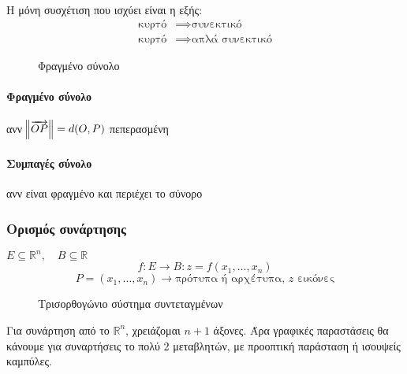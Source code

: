 \documentclass[11pt,a4paper,titlepage]{article}
\begin{document}
\paragraph{}
Η μόνη συσχέτιση που ισχύει είναι η εξής:
\begin{align*}
\text{κυρτό} &\implies \text{συνεκτικό} \\
\text{κυρτό} &\implies \text{απλά συνεκτικό}
\end{align*}

\begin{wrapfigure}{r}{0.3\textwidth}
\caption{Φραγμένο σύνολο}
\end{wrapfigure}

\paragraph{Φραγμένο σύνολο} ανν \(\norm{\overrightarrow{OP}} = d(O,P)\) πεπερασμένη
\paragraph{Συμπαγές σύνολο} ανν είναι φραγμένο και περιέχει το σύνορο

\subsubsection{Ορισμός συνάρτησης}

\(E \subseteq   \mathbb R^n, \quad B \subseteq  \mathbb R \)
\[f: E \rightarrow B: z = f(x_1, \dots, x_n) \]
\[P = \left( x_1, \dots, x_n \right) \rightarrow \text{πρότυπα ή αρχέτυπα, }z\text{ εικόνες} \]


\begin{wrapfigure}{r}{0.25\textwidth}
\centering
\caption{Τρισορθογώνιο σύστημα συντεταγμένων}
\end{wrapfigure}
Για συνάρτηση από το \( \mathbb R ^n\), χρειάζομαι \(n+1\) άξονες. Άρα γραφικές παραστάσεις θα κάνουμε για συναρτήσεις το πολύ 2 μεταβλητών, με προοπτική παράσταση ή ισουψείς καμπύλες.
\end{document}
